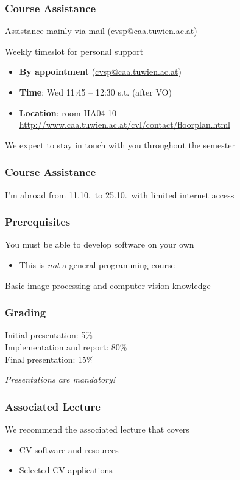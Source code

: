\documentclass[xetex,professionalfont]{beamer}
\begin{document}

\begin{frame}
\frametitle{Course Assistance}

Assistance mainly via mail (\url{cvsp@caa.tuwien.ac.at})

\bigskip
Weekly timeslot for personal support
\begin{itemize}
	\item \textbf{By appointment} (\url{cvsp@caa.tuwien.ac.at})
	\item \textbf{Time}: Wed 11:45 -- 12:30 s.t. (after VO)
	\item \textbf{Location}: room HA04-10 \scriptsize\url{http://www.caa.tuwien.ac.at/cvl/contact/floorplan.html}\normalsize
\end{itemize}

\bigskip
We expect to stay in touch with you throughout the semester

\end{frame}


\begin{frame}
\frametitle{Course Assistance}

I'm abroad from 11.10.\ to 25.10.\ with limited internet access

\end{frame}


\begin{frame}
\frametitle{Prerequisites}

You must be able to develop software on your own
\begin{itemize}
	\item This is \emph{not} a general programming course
\end{itemize}

\bigskip
Basic image processing and computer vision knowledge

\end{frame}


\begin{frame}
\frametitle{Grading}

Initial presentation: 5\% \\
Implementation and report: 80\% \\
Final presentation: 15\%

\bigskip
\emph{Presentations are mandatory!}

\end{frame}


\begin{frame}
\frametitle{Associated Lecture}

We recommend the associated lecture that covers
\begin{itemize}
	\item CV software and resources
	\item Selected CV applications
\end{itemize}

\end{frame}
\end{document}
